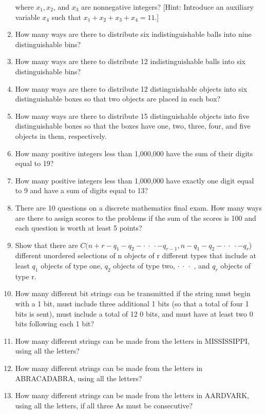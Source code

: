 \documentclass[11pt,a4paper]{book}
\begin{document}
\begin{enumerate}
where $x_1, x_2$, and $x_3$ are nonnegative integers? [Hint: Introduce an auxiliary variable $x_4$ such that $x_1 + x_2 + x_3 + x_4 = 11$.]
\item How many ways are there to distribute six indistinguishable balls into nine distinguishable bins?
\item How many ways are there to distribute 12 indistinguishable balls into six distinguishable bins? 
\item How many ways are there to distribute 12 distinguishable objects into six distinguishable boxes so that two objects are placed in each box?
\item How many ways are there to distribute 15 distinguishable objects into five distinguishable boxes so that the boxes have one, two, three, four, and five objects in them, respectively.
\item How many positive integers less than 1,000,000 have the sum of their digits equal to 19?
\item How many positive integers less than 1,000,000 have exactly one digit equal to 9 and have a sum of digits equal to 13?
\item There are 10 questions on a discrete mathematics final exam.
How many ways are there to assign scores to the problems if the sum of the scores is 100 and each question is worth at least 5 points?
\item Show that there are $C(n + r - q_1 - q_2 -\cdot~\cdot~\cdot-q_{r-1}, n - q_1 - q_2 -\cdot~\cdot~\cdot-q_r$) different unordered selections of n objects of r different types that include at least $q_1$ objects of type one, $q_2$ objects of type two, $\cdot~\cdot~\cdot$ , and $q_r$ objects of type r.
\item How many different bit strings can be transmitted if the string must begin with a 1 bit, must include three additional 1 bits (so that a total of four 1 bits is sent), must include a total of 12 0 bits, and must have at least two 0 bits following each 1 bit?
\item How many different strings can be made from the letters in MISSISSIPPI, using all the letters? 
\item How many different strings can be made from the letters in ABRACADABRA, using all the letters?
\item How many different strings can be made from the letters in AARDVARK, using all the letters, if all three As must be consecutive?

\end{enumerate}
\end{document}
